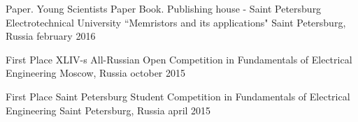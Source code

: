 

\begin{cventries}

  \cventry
  	{Paper. Young Scientists Paper Book. Publishing house - Saint Petersburg Electrotechnical University}
  	{``Memristors and its applications"}
    {Saint Petersburg, Russia}
    {february 2016}
    {}
  \vspace{\acvSectionContentTopSkip}
  \vspace{-8mm}

  \cventry
  	{First Place}
  	{XLIV-s All-Russian Open Competition in Fundamentals of Electrical Engineering}
    {Moscow, Russia}
    {october 2015}
    {}
  \vspace{\acvSectionContentTopSkip}
  \vspace{-8mm}

  \cventry
  	{First Place}
  	{Saint Petersburg Student Competition in Fundamentals of Electrical Engineering}
  	{Saint Petersburg, Russia}
    {april 2015}
    {}
  \vspace{\acvSectionContentTopSkip}
  \vspace{-8mm}


\end{cventries}
